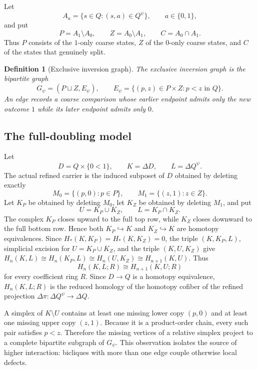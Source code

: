 \documentclass[11pt]{article}
\newtheorem{definition}[theorem]{Definition}
\begin{document}
Let
\[
A_a=\{s\in Q:(s,a)\in Q^\psi\},\qquad a\in\{0,1\},
\]
and put
\[
P=A_1\setminus A_0,\qquad Z=A_0\setminus A_1,\qquad
C=A_0\cap A_1.
\]
Thus $P$ consists of the $1$-only coarse states, $Z$ of the $0$-only coarse
states, and $C$ of the states that genuinely split.

\begin{definition}[Exclusive inversion graph]
\label{def:exclusive-inversion-graph}
The \emph{exclusive inversion graph} is the bipartite graph
\[
G_\psi=(P\sqcup Z,E_\psi),\qquad
E_\psi=\{(p,z)\in P\times Z:p<z\text{ in }Q\}.
\]
An edge records a coarse comparison whose earlier endpoint admits only the new
outcome $1$ while its later endpoint admits only $0$.
\end{definition}

\subsection{The full-doubling model}

Let
\[
D=Q\times\{0<1\},\qquad K=\Delta D,\qquad L=\Delta Q^\psi.
\]
The actual refined carrier is the induced subposet of $D$ obtained by deleting
exactly
\[
M_0=\{(p,0):p\in P\},\qquad
M_1=\{(z,1):z\in Z\}.
\]
Let $K_P$ be obtained by deleting $M_0$, let $K_Z$ be obtained by deleting
$M_1$, and put
\[
U=K_P\cup K_Z,\qquad L=K_P\cap K_Z.
\]
The complex $K_P$ closes upward to the full top row, while $K_Z$ closes
downward to the full bottom row.  Hence both $K_P\hookrightarrow K$ and
$K_Z\hookrightarrow K$ are homotopy equivalences.  Since $H_*(K,K_P)=H_*(K,K_Z)=0$, the triple $(K,K_P,L)$,
simplicial excision for $U=K_P\cup K_Z$, and the triple $(K,U,K_Z)$ give
$H_n(K,L)\cong H_n(K_P,L)\cong H_n(U,K_Z)\cong H_{n+1}(K,U)$.
Thus
\begin{equation}
H_n(K,L;R)\cong H_{n+1}(K,U;R)
\label{eq:two-colour-shift}
\end{equation}
for every coefficient ring $R$.  Since $D\to Q$ is a homotopy equivalence,
$H_n(K,L;R)$ is the reduced homology of the homotopy cofiber of the refined
projection $\Delta\pi:\Delta Q^\psi\to\Delta Q$.

A simplex of $K\setminus U$ contains at least one missing lower copy $(p,0)$
and at least one missing upper copy $(z,1)$.  Because it is a product-order
chain, every such pair satisfies $p<z$.  Therefore the missing vertices of a
relative simplex project to a complete bipartite subgraph of $G_\psi$.  This
observation isolates the source of higher interaction: bicliques with more than
one edge couple otherwise local defects.
\end{document}
